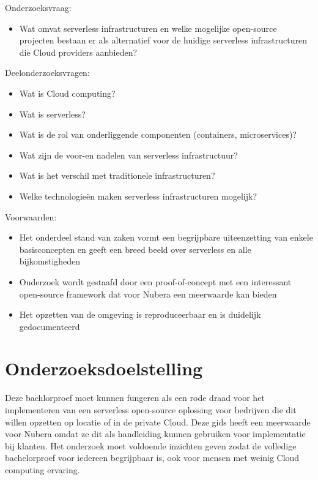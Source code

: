 Onderzoeksvraag: 
\begin{itemize}
    \item Wat omvat serverless infrastructuren en welke mogelijke open-source projecten bestaan er als alternatief voor de huidige serverless infrastructuren die Cloud providers aanbieden?
\end{itemize}

Deelonderzoeksvragen: 
\begin{itemize}
    \item Wat is Cloud computing?
    \item Wat is serverless?
    \item Wat is de rol van onderliggende componenten (containers, microservices)?
    \item Wat zijn de voor-en nadelen van serverless infrastructuur?
    \item Wat is het verschil met traditionele infrastructuren?
    \item Welke technologieën maken serverless infrastructuren mogelijk?
\end{itemize}

Voorwaarden: 
\begin{itemize}
    \item Het onderdeel stand van zaken vormt een begrijpbare uiteenzetting van enkele basisconcepten en geeft een breed beeld over serverless en alle bijkomstigheden
    \item Onderzoek wordt gestaafd door een proof-of-concept met een interessant open-source framework dat voor Nubera een meerwaarde kan bieden
    \item Het opzetten van de omgeving is reproduceerbaar en is duidelijk gedocumenteerd
\end{itemize}



\section{Onderzoeksdoelstelling}
\label{sec:onderzoeksdoelstelling}

Deze bachlorproef moet kunnen fungeren als een rode draad voor het implementeren van een serverless open-source oplossing voor bedrijven die dit willen opzetten op locatie of in de private Cloud. Deze gids heeft een meerwaarde voor Nubera omdat ze dit als handleiding kunnen gebruiken voor implementatie bij klanten. Het onderzoek moet voldoende inzichten geven zodat de volledige bachelorproef voor iedereen begrijpbaar is, ook voor mensen met weinig Cloud computing ervaring.


